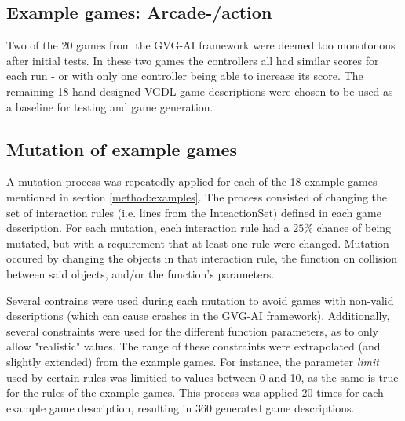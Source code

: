 \documentclass[a4paper,titlepage,final, twoside]{report}
\begin{document}
\subsection{Example games: Arcade-/action}
Two of the 20 games from the GVG-AI framework were deemed too monotonous after initial tests. 
In these two games the controllers all had similar scores for each run - or with only one controller being able to increase its score.
The remaining 18 hand-designed VGDL game descriptions were chosen to be used as a baseline for testing and game generation. 




\subsection{Mutation of example games}
\label{method:mutation}
A mutation process was repeatedly applied for each of the 18 example games mentioned in section \ref{method:examples}. 
The process consisted of changing the set of interaction rules (i.e. lines from the InteactionSet) defined in each game description.
For each mutation, each interaction rule had a $25\%$ chance of being mutated, but with a requirement that at least one rule were changed. 
Mutation occured by changing the objects in that interaction rule, the function on collision between said objects, and/or the function's parameters.

Several contrains were used during each mutation to avoid games with non-valid descriptions (which can cause crashes in the GVG-AI framework).
Additionally, several constraints were used for the different function parameters, as to only allow "realistic" values. 
The range of these constraints were extrapolated (and slightly extended) from the example games. 
For instance, the parameter \emph{limit} used by certain rules was limitied to values between 0 and 10, as the same is true for the rules of the example games. 
This process was applied 20 times for each example game description, resulting in 360 generated game descriptions.
\end{document}
